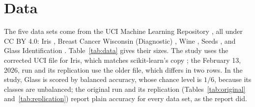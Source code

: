 \section{Data}
\label{sec:data}

The five data sets come from the UCI Machine Learning Repository \cite{uci}, all under CC BY 4.0: Iris \cite{fisher1936,uciiris}, Breast Cancer Wisconsin (Diagnostic) \cite{wolberg1995,ucibc}, Wine \cite{aeberhard1994,uciwine}, Seeds \cite{charytanowicz2010,uciseeds}, and Glass Identification \cite{german1987}. Table~\ref{tab:data} gives their sizes. The study uses the corrected UCI file for Iris, which matches scikit-learn's copy \cite{pedregosa2011}; the February 13, 2026, run and its replication use the older file, which differs in two rows. In the study, Glass is scored by balanced accuracy, whose chance level is $1/6$, because its classes are unbalanced; the original run and its replication (Tables~\ref{tab:original} and~\ref{tab:replication}) report plain accuracy for every data set, as the report did.

\begin{table}[t]
\caption{The data sets. The last column is the share of the majority class in the test rows.}
\label{tab:data}
\centering
\footnotesize

\end{table}
